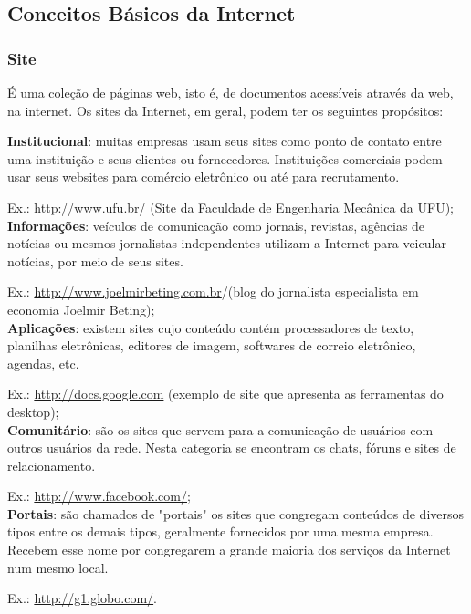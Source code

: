 \documentclass[hidelinks,12pt]{article}
\begin{document}
		\subsection{Conceitos Básicos da Internet}


			 \subsubsection{Site}

			É uma coleção de páginas web, isto é, de documentos acessíveis através da web, na internet. Os sites da Internet, em geral, podem ter os seguintes propósitos:

			 \textbf{Institucional}: muitas empresas usam seus sites como ponto de contato entre uma instituição e seus clientes ou fornecedores. Instituições comerciais podem usar seus websites para comércio eletrônico ou até para recrutamento.

			Ex.: http://www.ufu.br/ (Site da Faculdade de Engenharia Mecânica da UFU);\\


			 \textbf{Informações}: veículos de comunicação como jornais, revistas, agências de notícias ou mesmos jornalistas independentes utilizam a Internet para veicular notícias, por meio de seus sites.

			Ex.: \url{http://www.joelmirbeting.com.br}/(blog do jornalista especialista em economia Joelmir Beting);\\


			 \textbf{Aplicações}: existem sites cujo conteúdo contém processadores de texto, planilhas eletrônicas, editores de imagem, softwares de correio eletrônico, agendas, etc.

			Ex.: \url{http://docs.google.com} (exemplo de site que apresenta as ferramentas do desktop);\\


			 \textbf{Comunitário}: são os sites que servem para a comunicação de usuários com outros usuários da rede. Nesta categoria se encontram os chats, fóruns e sites de relacionamento.

			Ex.: \url{http://www.facebook.com/};\\


			\textbf{Portais}: são chamados de "portais" os sites que congregam conteúdos de diversos tipos entre os demais tipos, geralmente fornecidos por uma mesma empresa. Recebem esse nome por congregarem a grande maioria dos serviços da Internet num mesmo local.

			Ex.: \url{http://g1.globo.com/}.\\
\end{document}
